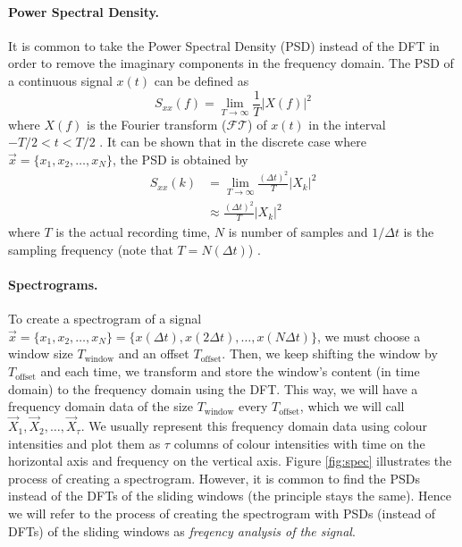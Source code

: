 \paragraph{Power Spectral Density.}
	It is common to take the Power Spectral Density (PSD) instead of the DFT in order to remove the imaginary components in the frequency domain. The PSD of a continuous signal $x(t)$ can be defined as
	\begin{equation}
		S_{xx}(f) = \lim_{T \to \infty} \frac{1}{T} \left| X(f) \right|^2
	\end{equation}
	where $X(f)$ is the Fourier transform ($\mathcal{FT}$) of $x(t)$ in the interval $-T / 2 < t < T / 2$ \cite{hlt}. It can be shown that in the discrete case where $\vec x = \{x_1, x_2, \dotsc, x_{N}\}$, the PSD is obtained by
	\begin{align}
		S_{xx}(k) 	&= \lim_{T \to \infty} \frac{(\Delta t)^2}{T} |X_k|^2\\
					&\approx \frac{(\Delta t)^2}{T} |X_k|^2
	\end{align}
	where $T$ is the actual recording time, $N$ is number of samples and $1/\Delta t$ is the sampling frequency (note that $T = N(\Delta t)$) \cite{wiki:PSD}.

\paragraph{Spectrograms.}
	To create a spectrogram of a signal $\vec x = \{x_1, x_2, \dotsc, x_N\} = \{x(\Delta t), x(2\Delta t), \dotsc, x(N\Delta t)\}$, we must choose a window size $T_\text{window}$ and an offset $T_\text{offset}$. Then, we keep shifting the window by $T_\text{offset}$ and each time, we transform and store the window's content (in time domain) to the frequency domain using the DFT. This way, we will have a frequency domain data of the size $T_\text{window}$ every $T_\text{offset}$, which we will call $\vec X_1, \vec X_2, \dotsc, \vec X_\tau$. We usually represent this frequency domain data using colour intensities and plot them as $\tau$ columns of colour intensities with time on the horizontal axis and frequency on the vertical axis. Figure \ref{fig:spec} illustrates the process of creating a spectrogram. However, it is common to find the PSDs instead of the DFTs of the sliding windows (the principle stays the same). Hence we will refer to the process of creating the spectrogram with PSDs (instead of DFTs) of the sliding windows as \emph{freqency analysis of the signal}.

